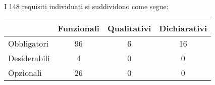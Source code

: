 I 148 requisiti individuati si suddividono come segue:
\begin{center}
  \centering
  \begin{tabular}{|l|c|c|c|}
    \hline
      & Funzionali & Qualitativi & Dichiarativi   \\
\hline
Obbligatori &      96     &    6     & 16       \\
\hline
Desiderabili &     4     &     0     & 0    \\
\hline
Opzionali   &      26     &    0     & 0    \\
\hline
  \end{tabular}
\end{center}

